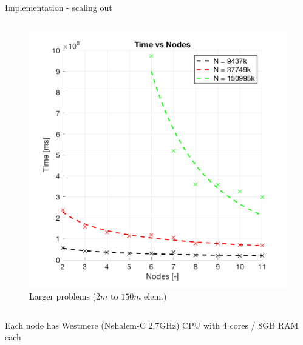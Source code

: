 \documentclass[c]{beamer}
\begin{document}
\begin{frame}{Implementation - scaling out}
\begin{columns}
  \begin{column}{0.5\textwidth}
    \begin{figure}
      \centering
      \includegraphics[width=1\textwidth]{img/TotalTimeVsNodeCount_BIG.png}
      \caption{\tiny Larger problems ($2m$ to $150m$ elem.)}
    \end{figure}
  \end{column}
\end{columns}
    
    {\tiny * Each node has Westmere (Nehalem-C 2.7GHz) CPU with 4 cores / 8GB RAM each}

\end{frame}

\end{document}
